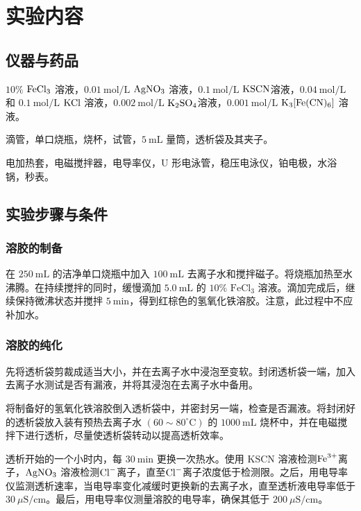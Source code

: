 \section{实验内容\cite{pcl2002}}

\subsection{仪器与药品}

$10\%$ $\ce{FeCl3}$ 溶液，$0.01\ \mathrm{mol/L}$ $\ce{AgNO3}$ 溶液，$0.1\ \mathrm{mol/L}$ $ \ce{KSCN} $溶液，$0.04\ \mathrm{mol/L}$ 和 $0.1\ \mathrm{mol/L}$ $\ce{KCl}$ 溶液，$0.002\ \mathrm{mol/L}$ $ \ce{K2SO4} $溶液，$0.001\ \mathrm{mol/L}$ $\ce{K3[Fe(CN)6]}$ 溶液。
 
滴管，单口烧瓶，烧杯，试管，$5\ \mathrm{mL}$ 量筒，透析袋及其夹子。

电加热套，电磁搅拌器，电导率仪，$\mathrm{U}$ 形电泳管，稳压电泳仪，铂电极，水浴锅，秒表。

\subsection{实验步骤与条件}

\subsubsection{ 溶胶的制备}
在 $250\ \mathrm{mL}$ 的洁净单口烧瓶中加入 $100\ \mathrm{mL}$ 去离子水和搅拌磁子。将烧瓶加热至水沸腾。在持续搅拌的同时，缓慢滴加 $5.0\ \mathrm{mL}$ 的 $10\%$ $\mathrm{FeCl}_3$ 溶液。滴加完成后，继续保持微沸状态并搅拌 $5\ \mathrm{min}$，得到红棕色的氢氧化铁溶胶。注意，此过程中不应补加水。

\subsubsection{ 溶胶的纯化}
先将透析袋剪裁成适当大小，并在去离子水中浸泡至变软。封闭透析袋一端，加入去离子水测试是否有漏液，并将其浸泡在去离子水中备用。

将制备好的氢氧化铁溶胶倒入透析袋中，并密封另一端，检查是否漏液。将封闭好的透析袋放入装有预热去离子水 $(60 \sim 80^{\circ}\mathrm{C})$ 的 $1000\ \mathrm{mL}$ 烧杯中，并在电磁搅拌下进行透析，尽量使透析袋转动以提高透析效率。

透析开始的一个小时内，每 $30\ \mathrm{min}$ 更换一次热水。使用 $\mathrm{KSCN}$ 溶液检测$ \ce{Fe^3+} $离子，$\ce{AgNO3}$ 溶液检测$ \ce{Cl-} $离子，直至$ \ce{Cl-} $离子浓度低于检测限。之后，用电导率仪监测透析速率，当电导率变化减缓时更换新的去离子水，直至透析液电导率低于 $30\ \mu\mathrm{S/cm}$。最后，用电导率仪测量溶胶的电导率，确保其低于 $200\ \mu\mathrm{S/cm}$。

